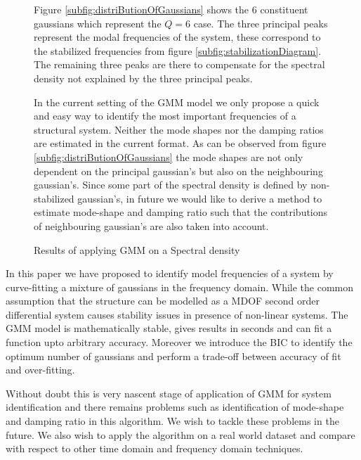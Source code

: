 \begin{figure}[!ht]
Figure \ref{subfig:distriButionOfGaussians} shows the $6$ constituent gaussians which represent the $Q=6$ case. The three principal peaks represent the modal frequencies of the system, these correspond to the stabilized frequencies from figure \ref{subfig:stabilizationDiagram}. The remaining three peaks are there to compensate for the spectral density not explained by the three principal peaks. 

In the current setting of the GMM model we only propose a quick and easy way to identify the most important frequencies of a structural system. Neither the mode shapes nor the damping ratios are estimated in the current format. As can be observed from figure \ref{subfig:distriButionOfGaussians} the mode shapes are not only dependent on the principal gaussian's but also on the neighbouring gaussian's. Since some part of the spectral density is defined by non-stabilized gaussian's, in future we would like to derive a method to estimate mode-shape and damping ratio such that the contributions of neighbouring gaussian's are also taken into account.
  
  \caption{Results of applying GMM on a Spectral density}
\end{figure}

In this paper we have proposed to identify model frequencies of a system by curve-fitting a mixture of gaussians in the frequency domain. While the common assumption that the structure can be modelled as a MDOF second order differential system causes stability issues in presence of non-linear systems. The GMM model is mathematically stable, gives results in seconds and can fit a function upto arbitrary accuracy. Moreover we introduce the BIC to identify the optimum number of gaussians and perform a trade-off between accuracy of fit and over-fitting. 

Without doubt this is very nascent stage of application of GMM for system identification and there remains problems such as identification of mode-shape and damping ratio in this algorithm. We wish to tackle these problems in the future. We also wish to apply the algorithm on a real world dataset and compare with respect to other time domain and frequency domain techniques.


